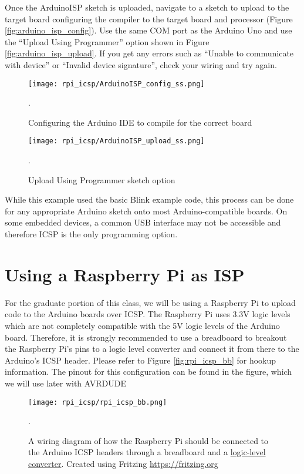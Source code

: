 Once the ArduinoISP sketch is uploaded, navigate to a sketch to upload to the target board configuring the compiler to the target board and processor (Figure \ref{fig:arduino_isp_config}). 
Use the same COM port as the Arduino Uno and use the “Upload Using Programmer” option  shown in Figure \ref{fig:arduino_isp_upload}. 
If you get any errors such as “Unable to communicate with device” or “Invalid device signature”, check your wiring and try again.

\begin{figure}
    \texttt{[image: rpi\_icsp/ArduinoISP\_config\_ss.png]}
    \caption[ArduinoISP Config]{Configuring the Arduino IDE to compile for the correct board}.
\end{figure}

\begin{figure}
    \texttt{[image: rpi\_icsp/ArduinoISP\_upload\_ss.png]}
    \caption[ArduinoISP Upload]{Upload Using Programmer sketch option}.
\end{figure}

While this example used the basic Blink example code, this process can be done for any appropriate Arduino sketch onto most Arduino-compatible boards. 
On some embedded devices, a common USB interface may not be accessible and therefore ICSP is the only programming option.

\section*{Using a Raspberry Pi as ISP}

For the graduate portion of this class, we will be using a Raspberry Pi to upload code to the Arduino boards over ICSP. 
The Raspberry Pi uses 3.3V logic levels which are not completely compatible with the 5V logic levels of the Arduino board.
Therefore, it is strongly recommended to use a breadboard to breakout the Raspberry Pi's pins to a logic level converter
and connect it from there to the Arduino's ICSP header. Please refer to Figure \ref{fig:rpi_icsp_bb} for hookup information. 
The pinout for this configuration can be found in the figure, which we will use later with AVRDUDE

    \begin{figure}[h!]
        \texttt{[image: rpi\_icsp/rpi\_icsp\_bb.png]}
        \caption[Raspberry Pi ISP Breadboard]{A wiring diagram of how the Raspberry Pi should be connected to the Arduino ICSP headers through a breadboard and a \href{https://www.adafruit.com/product/757}{logic-level     converter}. 
        Created using Fritzing \url{https://fritzing.org}}.
    \end{figure}

